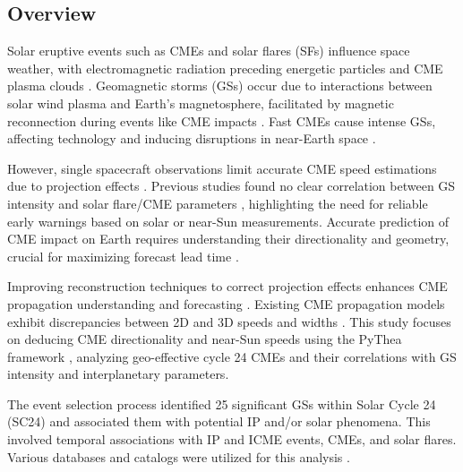 \subsection{Overview}
Solar eruptive events such as CMEs and solar flares (SFs) influence space weather, with electromagnetic radiation preceding energetic particles and CME plasma clouds \citep{fletcher_2011, webb_2012, klein_2017, temmer_2021, malandraki_2018, gopalswamy_sun_sw_2022}. Geomagnetic storms (GSs) occur due to interactions between solar wind plasma and Earth's magnetosphere, facilitated by magnetic reconnection during events like CME impacts \citep{dungey_1961, akasofu_1981, echer_2022, gonzalez_1994, saiz_2013, lakhina_2016}. Fast CMEs cause intense GSs, affecting technology and inducing disruptions in near-Earth space \citep{tsurutani_1997, zhang_2007, wu_2016, borovsky_2006, pulkkinen_2007}.

However, single spacecraft observations limit accurate CME speed estimations due to projection effects \citep{paouris_2021, kouloumvakos_2022}. Previous studies found no clear correlation between GS intensity and solar flare/CME parameters \citep{samwel_2023}, highlighting the need for reliable early warnings based on solar or near-Sun measurements. Accurate prediction of CME impact on Earth requires understanding their directionality and geometry, crucial for maximizing forecast lead time \citep{kay_2018, vourlidas_2003, jackson_2010}.

Improving reconstruction techniques to correct projection effects enhances CME propagation understanding and forecasting \citep{thernisien_2009, mierla_2010, wood_2010, thernisien_2011}. Existing CME propagation models exhibit discrepancies between 2D and 3D speeds and widths \citep{odstrcil_2004, xie_2004, vrvsnak_2013, pomoell_2018, jang_2016, verbeke_2022}. This study focuses on deducing CME directionality and near-Sun speeds using the PyThea framework \citep{kouloumvakos_2022}, analyzing geo-effective cycle 24 CMEs and their correlations with GS intensity and interplanetary parameters.

The event selection process identified 25 significant GSs within Solar Cycle 24 (SC24) and associated them with potential IP and/or solar phenomena. This involved temporal associations with IP and ICME events, CMEs, and solar flares. Various databases and catalogs were utilized for this analysis \citep{gonzalez_1994, gopalswamy_gs_2022, qiu_2022, besliu_2022, abe_2023, zhang_2007, gonzalez_2007, gopalswamy_2008, echer_2013, manu_2022}.

